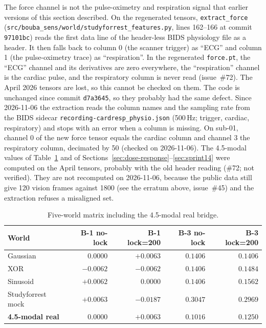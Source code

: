 \documentclass{article}
\begin{document}
The force channel is not the pulse-oximetry and respiration signal
that earlier versions of this section described. On the regenerated tensors,
\texttt{extract\_force}
(\texttt{src/bouba\_sens/world/studyforrest\_features.py},
lines 162--166 at commit \texttt{97101bc}) reads the first data line of the header-less BIDS
physiology file as a header. It then falls back to column 0 (the
scanner trigger) as ``ECG'' and column 1 (the pulse-oximetry trace)
as ``respiration''. In the regenerated \texttt{force.pt}, the ``ECG''
channel and its derivatives are zero everywhere, the ``respiration''
channel is the cardiac pulse, and the respiratory column is never
read (issue~\#72). The April 2026 tensors are lost, so this cannot
be checked on them. The code is unchanged since commit
\texttt{d7a3645}, so they probably had the same defect.
Since 2026-11-06 the extraction reads the column names and the
sampling rate from the BIDS sidecar \texttt{recording-cardresp\_physio.json}
(500\,Hz; trigger, cardiac, respiratory) and stops with an error when
a column is missing. On sub-01, channel 0 of the new force tensor
equals the cardiac column and channel 3 the respiratory column,
decimated by 50 (checked on 2026-11-06). The 4.5-modal values of
Table~\ref{tab:five-world} and of
Sections~\ref{sec:dose-response}--\ref{sec:sprint14} were computed
on the April tensors, probably with the old header reading (\#72;
not verified). They are not recomputed on 2026-11-06, because
the public data still give 120 vision frames against 1800 (see the
erratum above, issue~\#45) and the extraction refuses a misaligned set.

\begin{table}[ht]
  \centering
  \caption{Five-world matrix including the 4.5-modal real bridge.}
  \label{tab:five-world}
  \begin{tabular}{lrrrr}
    \toprule
    World & B-1 no-lock & B-1 lock=200 & B-3 no-lock & B-3 lock=200 \\
    \midrule
    Gaussian & $0.0000$ & $+0.0063$ & $0.1406$ & $0.1406$ \\
    XOR      & $-0.0062$ & $-0.0062$ & $0.1406$ & $0.1484$ \\
    Sinusoid & $+0.0062$ & $0.0000$ & $0.1406$ & $0.1562$ \\
    Studyforrest mock & $+0.0063$ & $-0.0187$ & $0.3047$ & $0.2969$ \\
    \textbf{4.5-modal real} & $\mathbf{0.0000}$ & $\mathbf{+0.0063}$ & $\mathbf{0.1016}$ & $\mathbf{0.1250}$ \\
    \bottomrule
  \end{tabular}
\end{table}
\end{document}
